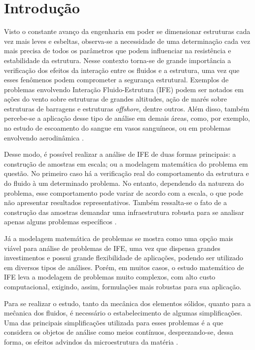 \documentclass[_ArquivoPrincipal.tex]{subfiles}
\begin{document}
\chapter{Introdução}

Visto o constante avanço da engenharia em poder se dimensionar estruturas cada vez mais leves e esbeltas, observa-se a necessidade de uma determinação cada vez mais precisa de todos os parâmetros que podem influenciar na resistência e estabilidade da estrutura. Nesse contexto torna-se de grande importância a verificação dos efeitos da interação entre os fluidos e a estrutura, uma vez que esses fenômenos podem comprometer a segurança estrutural. Exemplos de problemas envolvendo Interação Fluido-Estrutura (IFE) podem ser notados em ações do vento sobre estruturas de grandes altitudes, ação de marés sobre estruturas de barragens e estruturas \textit{offshore}, dentre outros. Além disso, também percebe-se a aplicação desse tipo de análise em demais áreas, como, por exemplo, no estudo de escoamento do sangue em vasos sanguíneos, ou em problemas envolvendo aerodinâmica \cite{sanches2014fluid, fernandes2020tecnica}.

Desse modo, é possível realizar a análise de IFE de duas formas principais: a construção de amostras em escala; ou a modelagem matemática do problema em questão. No primeiro caso há a verificação real do comportamento da estrutura e do fluido à um determinado problema. No entanto, dependendo da natureza do problema, esse comportamento pode variar de acordo com a escala, o que pode não apresentar resultados representativos. Também ressalta-se o fato de a construção das amostras demandar uma infraestrutura robusta para se analisar apenas alguns problemas específicos \cite{fernandes2020tecnica}.

Já a modelagem matemática de problemas se mostra como uma opção mais viável para análise de problemas de IFE, uma vez que dispensa grandes investimentos e possui grande flexibilidade de aplicações, podendo ser utilizado em diversos tipos de análises. Porém, em muitos casos, o estudo matemático de IFE leva a modelagem de problemas muito complexos, com alto custo computacional, exigindo, assim, formulações mais robustas para sua aplicação.

Para se realizar o estudo, tanto da mecânica dos elementos sólidos, quanto para a meĉanica dos fluidos, é necessário o estabelecimento de algumas simplificações. Uma das principais simplificações utilizada para esses problemas é a que considera os objetos de análise como meios contínuos, desprezando-se, dessa forma, os efeitos advindos da microestrutura da matéria \cite{lai2009introduction, mase2009continuum}.
\end{document}
